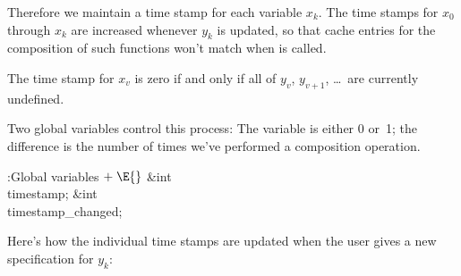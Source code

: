 Therefore we maintain a time stamp for each variable $x_k$. The time stamps
for $x_0$ through $x_k$ are increased whenever $y_k$ is updated, so that
cache entries for the composition of such functions won't match when
 is called.

The time stamp for $x_v$ is zero if and only if all of $y_v$, $y_{v+1}$,
\dots\ are currently undefined.

Two global variables control this process:
The variable  is either 0 or~1;
the difference  is the number of
times
we've performed a composition operation.

\fi

\B{}:Global variables\X${}\mathrel+\E{}$\6
\&{int} \\{timestamp};\6
\&{int} \\{timestamp\_changed};\par
\fi

Here's how the individual time stamps are updated when the user gives a
new
specification for $y_k$:

